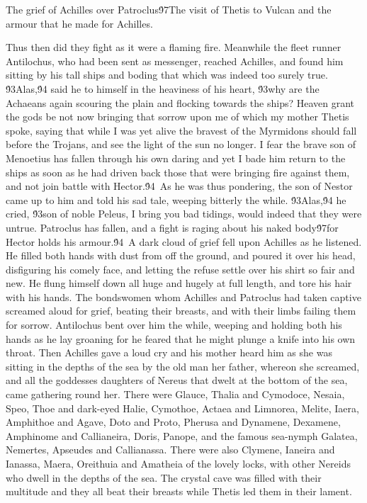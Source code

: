 {  The grief of Achilles over Patroclus\'97The visit of Thetis to Vulcan and the armour that he made for Achilles.\
\pard{}\qj{}

  Thus then did they fight as it were a flaming fire. Meanwhile the fleet runner Antilochus, who had been sent as messenger, reached Achilles, and found him sitting by his tall ships and boding that which was indeed too surely true. \'93Alas,\'94 said he to himself in the heaviness of his heart, \'93why are the Achaeans again scouring the plain and flocking towards the ships? Heaven grant the gods be not now bringing that sorrow upon me of which my mother Thetis spoke, saying that while I was yet alive the bravest of the Myrmidons should fall before the Trojans, and see the light of the sun no longer. I fear the brave son of Menoetius has fallen through his own daring and yet I bade him return to the ships as soon as he had driven back those that were bringing fire against them, and not join battle with Hector.\'94\
As he was thus pondering, the son of Nestor came up to him and told his sad tale, weeping bitterly the while. \'93Alas,\'94 he cried, \'93son of noble Peleus, I bring you bad tidings, would indeed that they were untrue. Patroclus has fallen, and a fight is raging about his naked body\'97for Hector holds his armour.\'94\
A dark cloud of grief fell upon Achilles as he listened. He filled both hands with dust from off the ground, and poured it over his head, disfiguring his comely face, and letting the refuse settle over his shirt so fair and new. He flung himself down all huge and hugely at full length, and tore his hair with his hands. The bondswomen whom Achilles and Patroclus had taken captive screamed aloud for grief, beating their breasts, and with their limbs failing them for sorrow. Antilochus bent over him the while, weeping and holding both his hands as he lay groaning for he feared that he might plunge a knife into his own throat. Then Achilles gave a loud cry and his mother heard him as she was sitting in the depths of the sea by the old man her father, whereon she screamed, and all the goddesses daughters of Nereus that dwelt at the bottom of the sea, came gathering round her. There were Glauce, Thalia and Cymodoce, Nesaia, Speo, Thoe and dark-eyed Halie, Cymothoe, Actaea and Limnorea, Melite, Iaera, Amphithoe and Agave, Doto and Proto, Pherusa and Dynamene, Dexamene, Amphinome and Callianeira, Doris, Panope, and the famous sea-nymph Galatea, Nemertes, Apseudes and Callianassa. There were also Clymene, Ianeira and Ianassa, Maera, Oreithuia and Amatheia of the lovely locks, with other Nereids who dwell in the depths of the sea. The crystal cave was filled with their multitude and they all beat their breasts while Thetis led them in their lament.\
}
